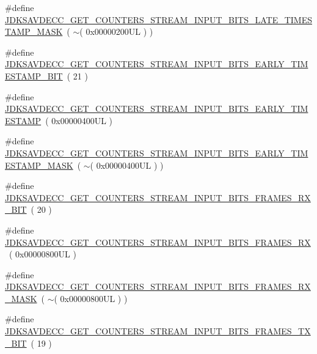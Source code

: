 \begin{DoxyCompactItemize}
\item 
\#define \hyperlink{group__get__counters__stream__input__bits_ga0935f020f8cf836182a1c6684fc0b8f5}{J\+D\+K\+S\+A\+V\+D\+E\+C\+C\+\_\+\+G\+E\+T\+\_\+\+C\+O\+U\+N\+T\+E\+R\+S\+\_\+\+S\+T\+R\+E\+A\+M\+\_\+\+I\+N\+P\+U\+T\+\_\+\+B\+I\+T\+S\+\_\+\+L\+A\+T\+E\+\_\+\+T\+I\+M\+E\+S\+T\+A\+M\+P\+\_\+\+M\+A\+SK}~( $\sim$( 0x00000200\+U\+L ) )
\item 
\#define \hyperlink{group__get__counters__stream__input__bits_ga2931fd798a11823db667d615578d8ffa}{J\+D\+K\+S\+A\+V\+D\+E\+C\+C\+\_\+\+G\+E\+T\+\_\+\+C\+O\+U\+N\+T\+E\+R\+S\+\_\+\+S\+T\+R\+E\+A\+M\+\_\+\+I\+N\+P\+U\+T\+\_\+\+B\+I\+T\+S\+\_\+\+E\+A\+R\+L\+Y\+\_\+\+T\+I\+M\+E\+S\+T\+A\+M\+P\+\_\+\+B\+IT}~( 21 )
\item 
\#define \hyperlink{group__get__counters__stream__input__bits_gaeb41571c97be5e41414d170f33570e86}{J\+D\+K\+S\+A\+V\+D\+E\+C\+C\+\_\+\+G\+E\+T\+\_\+\+C\+O\+U\+N\+T\+E\+R\+S\+\_\+\+S\+T\+R\+E\+A\+M\+\_\+\+I\+N\+P\+U\+T\+\_\+\+B\+I\+T\+S\+\_\+\+E\+A\+R\+L\+Y\+\_\+\+T\+I\+M\+E\+S\+T\+A\+MP}~( 0x00000400\+U\+L )
\item 
\#define \hyperlink{group__get__counters__stream__input__bits_ga0a0f54dee855efef8208f8beb417807a}{J\+D\+K\+S\+A\+V\+D\+E\+C\+C\+\_\+\+G\+E\+T\+\_\+\+C\+O\+U\+N\+T\+E\+R\+S\+\_\+\+S\+T\+R\+E\+A\+M\+\_\+\+I\+N\+P\+U\+T\+\_\+\+B\+I\+T\+S\+\_\+\+E\+A\+R\+L\+Y\+\_\+\+T\+I\+M\+E\+S\+T\+A\+M\+P\+\_\+\+M\+A\+SK}~( $\sim$( 0x00000400\+U\+L ) )
\item 
\#define \hyperlink{group__get__counters__stream__input__bits_gab0e5831dd1a404017be53683f206d3c1}{J\+D\+K\+S\+A\+V\+D\+E\+C\+C\+\_\+\+G\+E\+T\+\_\+\+C\+O\+U\+N\+T\+E\+R\+S\+\_\+\+S\+T\+R\+E\+A\+M\+\_\+\+I\+N\+P\+U\+T\+\_\+\+B\+I\+T\+S\+\_\+\+F\+R\+A\+M\+E\+S\+\_\+\+R\+X\+\_\+\+B\+IT}~( 20 )
\item 
\#define \hyperlink{group__get__counters__stream__input__bits_ga3a7125b74a9120db15644962762bdfcd}{J\+D\+K\+S\+A\+V\+D\+E\+C\+C\+\_\+\+G\+E\+T\+\_\+\+C\+O\+U\+N\+T\+E\+R\+S\+\_\+\+S\+T\+R\+E\+A\+M\+\_\+\+I\+N\+P\+U\+T\+\_\+\+B\+I\+T\+S\+\_\+\+F\+R\+A\+M\+E\+S\+\_\+\+RX}~( 0x00000800\+U\+L )
\item 
\#define \hyperlink{group__get__counters__stream__input__bits_ga14bb6691ff612d3b589ea408ea917b09}{J\+D\+K\+S\+A\+V\+D\+E\+C\+C\+\_\+\+G\+E\+T\+\_\+\+C\+O\+U\+N\+T\+E\+R\+S\+\_\+\+S\+T\+R\+E\+A\+M\+\_\+\+I\+N\+P\+U\+T\+\_\+\+B\+I\+T\+S\+\_\+\+F\+R\+A\+M\+E\+S\+\_\+\+R\+X\+\_\+\+M\+A\+SK}~( $\sim$( 0x00000800\+U\+L ) )
\item 
\#define \hyperlink{group__get__counters__stream__input__bits_ga83087dfe1185201571fef6806c1c404e}{J\+D\+K\+S\+A\+V\+D\+E\+C\+C\+\_\+\+G\+E\+T\+\_\+\+C\+O\+U\+N\+T\+E\+R\+S\+\_\+\+S\+T\+R\+E\+A\+M\+\_\+\+I\+N\+P\+U\+T\+\_\+\+B\+I\+T\+S\+\_\+\+F\+R\+A\+M\+E\+S\+\_\+\+T\+X\+\_\+\+B\+IT}~( 19 )

\end{DoxyCompactItemize}
